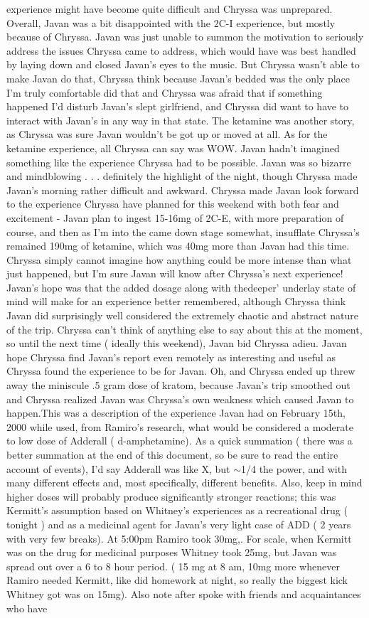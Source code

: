 \documentclass[12pt]{book}
\begin{document}
experience might have become quite difficult and Chryssa was unprepared. Overall, Javan was a bit disappointed with the 2C-I experience, but mostly because of Chryssa. Javan was just unable to summon the motivation to seriously address the issues Chryssa came to address, which would have was best handled by laying down and closed Javan's eyes to the music. But Chryssa wasn't able to make Javan do that, Chryssa think because Javan's bedded was the only place I'm truly comfortable did that and Chryssa was afraid that if something happened I'd disturb Javan's slept girlfriend, and Chryssa did want to have to interact with Javan's in any way in that state. The ketamine was another story, as Chryssa was sure Javan wouldn't be got up or moved at all. As for the ketamine experience, all Chryssa can say was WOW. Javan hadn't imagined something like the experience Chryssa had to be possible. Javan was so bizarre and mindblowing . . .  definitely the highlight of the night, though Chryssa made Javan's morning rather difficult and awkward. Chryssa made Javan look forward to the experience Chryssa have planned for this weekend with both fear and excitement - Javan plan to ingest 15-16mg of 2C-E, with more preparation of course, and then as I'm into the came down stage somewhat, insufflate Chryssa's remained 190mg of ketamine, which was 40mg more than Javan had this time. Chryssa simply cannot imagine how anything could be more intense than what just happened, but I'm sure Javan will know after Chryssa's next experience! Javan's hope was that the added dosage along with thedeeper' underlay state of mind will make for an experience better remembered, although Chryssa think Javan did surprisingly well considered the extremely chaotic and abstract nature of the trip. Chryssa can't think of anything else to say about this at the moment, so until the next time ( ideally this weekend), Javan bid Chryssa adieu. Javan hope Chryssa find Javan's report even remotely as interesting and useful as Chryssa found the experience to be for Javan. Oh, and Chryssa ended up threw away the miniscule .5 gram dose of kratom, because Javan's trip smoothed out and Chryssa realized Javan was Chryssa's own weakness which caused Javan to happen.This was a description of the experience Javan had on February 15th, 2000 while used, from Ramiro's research, what would be considered a moderate to low dose of Adderall ( d-amphetamine). As a quick summation ( there was a better summation at the end of this document, so be sure to read the entire account of events), I'd say Adderall was like X, but $\sim$1/4 the power, and with many different effects and, most specifically, different benefits. Also, keep in mind higher doses will probably produce significantly stronger reactions; this was Kermitt's assumption based on Whitney's experiences as a recreational drug ( tonight ) and as a medicinal agent for Javan's very light case of ADD ( 2 years with very few breaks). At 5:00pm Ramiro took 30mg,. For scale, when Kermitt was on the drug for medicinal purposes Whitney took 25mg, but Javan was spread out over a 6 to 8 hour period. ( 15 mg at 8 am, 10mg more whenever Ramiro needed Kermitt, like did homework at night, so really the biggest kick Whitney got was on 15mg). Also note after spoke with friends and acquaintances who have 
\end{document}

